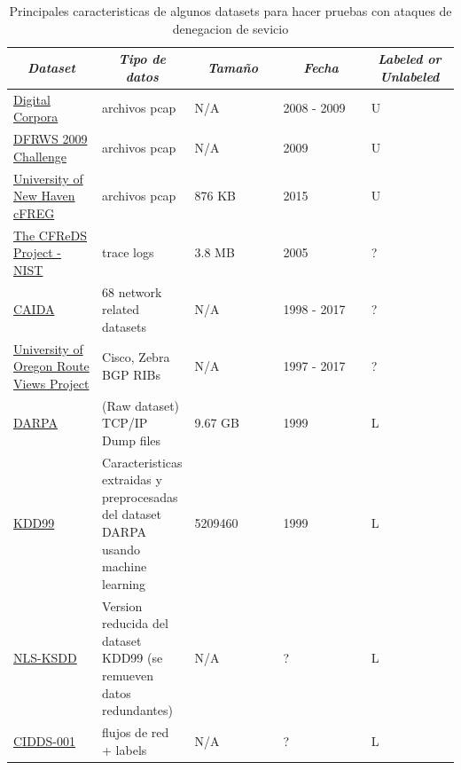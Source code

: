 \documentclass[12pt]{article}
\begin{document}
\begin{table}[htbp]
\centering
\begin{tabular}{|p{0.2\linewidth}|p{0.2\linewidth}|p{0.2\linewidth}|p{0.2\linewidth}|p{0.2\linewidth}|}\hline
\multicolumn{1}{|c|}{\textit{\textbf{Dataset}}} & 
\multicolumn{1}{c|}{\textit{\textbf{Tipo de datos}}} &
\multicolumn{1}{|c|}{\textit{\textbf{Tamaño}}} & 
\multicolumn{1}{|c|}{\textit{\textbf{Fecha}}} &
\multicolumn{1}{|c|}{\textit{\textbf{Labeled or Unlabeled}}} \tabularnewline \hline

\href{http://digitalcorpora.org/corpora/packet-dumps}{Digital Corpora} & 
archivos pcap &
N/A & 
2008 - 2009 & 
U 
\tabularnewline \hline

\href{https://web.archive.org/web/20160311200806/http://dfrws.org/2009/challenge/submission.shtml}{DFRWS 2009 Challenge} & 
archivos pcap &
N/A & 
2009 & 
U 
\tabularnewline \hline

\href{https://www.unhcfreg.com/datasetsandtools}{University of New Haven cFREG} & 
archivos pcap &
876 KB & 
2015 & 
U 
\tabularnewline \hline

\href{https://www.cfreds.nist.gov/dfrws/Rhino_Hunt.html}{The CFReDS Project - NIST} & 
trace logs &
3.8 MB & 
2005 & 
? 
\tabularnewline \hline

\href{http://www.caida.org/data/overview/}{CAIDA} & 
68 network related datasets &
N/A & 
1998 - 2017 & 
? 
\tabularnewline \hline

\href{http://www.routeviews.org/routeviews/}{University of Oregon Route Views Project} & 
Cisco, Zebra BGP RIBs &
N/A & 
1997 - 2017 & 
? 
\tabularnewline \hline

\href{https://www.ll.mit.edu/r-d/datasets}{DARPA} & 
(Raw dataset) TCP/IP Dump  files &
9.67 GB & 
1999 & 
L 
\tabularnewline \hline

\href{http://kdd.ics.uci.edu/databases/kddcup99/kddcup99.html}{KDD99} & 
Caracteristicas extraidas y preprocesadas del dataset DARPA usando machine learning &
5209460 & 
1999 & 
L 
\tabularnewline \hline

\href{http://www.unb.ca/cic/datasets/nsl.html}{NLS-KSDD} & 
Version reducida del dataset KDD99 (se remueven datos redundantes) &
N/A &
? & 
L 
\tabularnewline \hline


\href{https://www.hs-coburg.de/forschung-kooperation/forschungsprojekte-oeffentlich/ingenieurwissenschaften/cidds-coburg-intrusion-detection-data-sets.html}{CIDDS-001} & 
flujos de red + labels &
N/A &
? & 
L 
\tabularnewline \hline

\end{tabular}
\caption{Principales caracteristicas de algunos datasets para hacer pruebas con ataques de denegacion de sevicio} \label{tab:sometab}
\end{table} 
\end{document}
